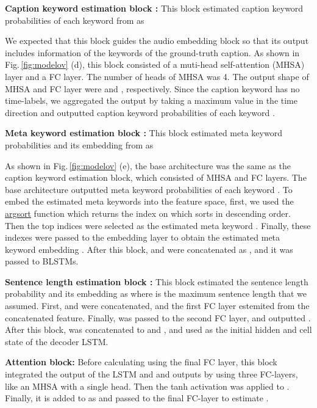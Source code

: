 \documentclass{article}
\begin{document}
\begin{sloppy}
\vspace{3pt}
\noindent
{\bf Caption keyword estimation block :}
This block estimated
caption keyword probabilities of each keyword
 from  as

We expected that this block guides the audio embedding block so that its output includes information of the keywords of the ground-truth caption.
As shown in Fig.\,\ref{fig:modelov} (d), this block consisted of a muti-head self-attention (MHSA) layer and a FC layer.
The number of heads of MHSA was 4.
The output shape of MHSA and FC layer were  and , respectively.
Since the caption keyword has no time-labels, we aggregated the output by taking a maximum value in the time direction and outputted caption keyword probabilities of each keyword .



\vspace{3pt}
\noindent
{\bf Meta keyword estimation block :} 
This block estimated meta keyword probabilities  and its embedding  from  as

As shown in Fig.\,\ref{fig:modelov} (e), the base architecture was the same as the caption keyword estimation block, which consisted of MHSA and FC layers.
The base architecture outputted meta keyword probabilities of each keyword .
To embed the estimated meta keywords into the feature space, first, we used the \url{argsort} function which returns the index on which  sorts in descending order.
Then the top  indices were selected as the estimated meta keyword .
Finally, these indexes were passed to the embedding layer to obtain the estimated meta keyword embedding .
After this block,  and  were concatenated as , and it was passed to BLSTMs.

\vspace{3pt}
\noindent
{\bf Sentence length estimation block :} 
This block estimated the sentence length probability  and its embedding  as
 where 
 is the maximum sentence length that we assumed.
First,  and  were concatenated, 
and the first FC layer estemited  from the concatenated feature.
Finally,  was passed to the second FC layer, and outputted .
After this block,  was concatenated to  and , and used as the initial hidden and cell state of the decoder LSTM.


\vspace{3pt}
\noindent
{\bf Attention block:} Before calculating  using the final FC layer, this block integrated the output of the LSTM  and  and outputs  by using three FC-layers, like an MHSA with a single head.
Then the tanh activation was applied to .
Finally, it is added to  as  and passed to the final FC-layer to estimate .


\end{sloppy}
\end{document}
